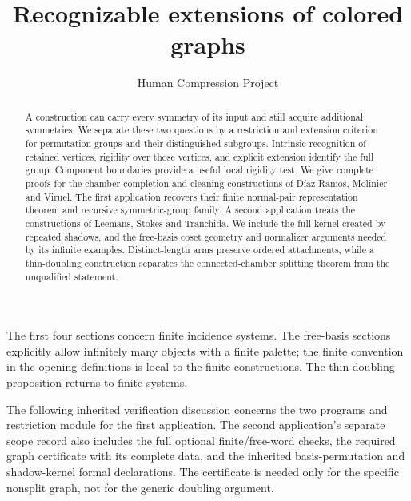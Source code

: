 
\title{Recognizable extensions of colored graphs}
\author{Human Compression Project}
\date{}

\maketitle
\begin{abstract}
A construction can carry every symmetry of its input and still acquire additional
symmetries. We separate these two questions by a restriction and extension
criterion for permutation groups and their distinguished subgroups. Intrinsic
recognition of retained vertices, rigidity over those vertices, and explicit
extension identify the full group. Component boundaries provide a useful local
rigidity test. We give complete proofs for the chamber completion and cleaning
constructions of D\'iaz Ramos, Molinier and Viruel. The first application recovers their finite normal-pair representation theorem
and recursive symmetric-group family. A second application treats the
constructions of Leemans, Stokes and Tranchida. We include the full kernel
created by repeated shadows, and the free-basis coset geometry and normalizer
arguments needed by its infinite examples. Distinct-length arms preserve
ordered attachments, while a thin-doubling construction separates the
connected-chamber splitting theorem from the unqualified statement.
\end{abstract}
The first four sections concern finite incidence systems. The free-basis
sections explicitly allow infinitely many objects with a finite palette;
the finite convention in the opening definitions is local to the finite
constructions. The thin-doubling proposition returns to finite systems.






The following inherited verification discussion concerns the two programs
and restriction module for the first application. The second application's
separate scope record also includes the full optional finite/free-word checks,
the required graph certificate with its complete data, and the inherited
basis-permutation and shadow-kernel formal declarations. The certificate is
needed only for the specific nonsplit graph, not for the generic doubling
argument.


